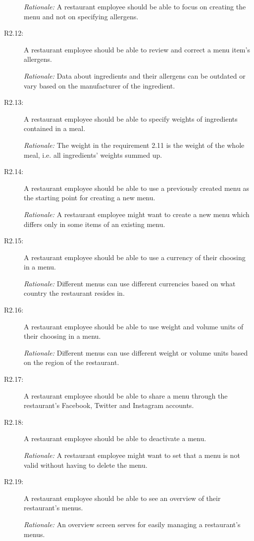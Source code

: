 \begin{description}
    \emph{Rationale:} A restaurant employee should be able to focus on creating the menu and not on specifying allergens.
    \item [R2.12:] A restaurant employee should be able to review and correct a menu item's allergens.

    \emph{Rationale:} Data about ingredients and their allergens can be outdated or vary based on the manufacturer of the ingredient.
    \item [R2.13:] A restaurant employee should be able to specify weights of ingredients contained in a meal.

    \emph{Rationale:} The weight in the requirement 2.11 is the weight of the whole meal, i.e. all ingredients' weights summed up.
    \item [R2.14:] A restaurant employee should be able to use a previously created menu as the starting point for creating a new menu.

    \emph{Rationale:} A restaurant employee might want to create a new menu which differs only in some items of an existing menu.
    \item [R2.15:] A restaurant employee should be able to use a currency of their choosing in a menu.

    \emph{Rationale:} Different menus can use different currencies based on what country the restaurant resides in.
    \item [R2.16:] A restaurant employee should be able to use weight and volume units of their choosing in a menu.

    \emph{Rationale:} Different menus can use different weight or volume units based on the region of the restaurant.
    \item [R2.17:] A restaurant employee should be able to share a menu through the restaurant's Facebook, Twitter and Instagram accounts.
    \item [R2.18:] A restaurant employee should be able to deactivate a menu.

    \emph{Rationale:} A restaurant employee might want to set that a menu is not valid without having to delete the menu.
    \item [R2.19:] A restaurant employee should be able to see an overview of their restaurant's menus.

    \emph{Rationale:} An overview screen serves for easily managing a restaurant's menus.
  \end{description}

\newpage


